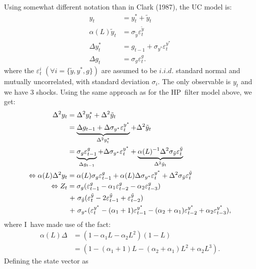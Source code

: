 \documentclass[a4paper,12pt]{article}
\newcommand{\bsq}{\begin{subequations}}\newcommand{\esq}{\end{subequations}}
\begin{document}
\bigskip 

Using somewhat different notation than in Clark (1987), the UC model is:\bsq%
\label{UC}%
\begin{align}
y_{t}& =y_{t}^{\ast }+\tilde{y}_{t}  \label{yUC} \\
\alpha (L)\tilde{y}_{t}& =\sigma _{\tilde{y}}\varepsilon _{t}^{\tilde{y}}
\label{ytldUC} \\
\Delta y_{t}^{\ast }& =g_{t-1}+\sigma _{y^{\ast }}\varepsilon _{t}^{y^{\ast
}}  \label{dy*UC} \\
\Delta g_{t}& =\sigma _{g}\varepsilon _{t}^{g}.  \label{dgUC}
\end{align}%
\esq where the $\varepsilon _{t}^{i}$ $(\forall i=\{\tilde{y},y^{\ast },g\})$
are assumed to be $i.i.d.$ standard normal and mutually uncorrelated, with
standard deviation $\sigma _{i}$. The only observable is $y_{t}$ and we have
3 shocks. Using the same approach as for the HP\ filter model above, we get:%
\begin{align}
\Delta ^{2}y_{t}& =\Delta ^{2}y_{t}^{\ast }+\Delta ^{2}\tilde{y}_{t}  \notag
\\
& =\underbrace{\Delta g_{t-1}+\Delta \sigma _{y^{\ast }}\varepsilon
_{t}^{y^{\ast }}}_{\Delta ^{2}y_{t}^{\ast }}+\Delta ^{2}\tilde{y}_{t}
\label{d2y} \\
& =\underbrace{\sigma _{g}\varepsilon _{t-1}^{g}}_{\Delta g_{t-1}}+\Delta
\sigma _{y^{\ast }}\varepsilon _{t}^{y^{\ast }}+\underbrace{\alpha
(L)^{-1}\Delta ^{2}\sigma _{\tilde{y}}\varepsilon _{t}^{\tilde{y}}}_{\Delta
^{2}\tilde{y}_{t}}  \notag \\
\Leftrightarrow \alpha (L)\Delta ^{2}y_{t}& =\alpha (L)\sigma
_{g}\varepsilon _{t-1}^{g}+\alpha (L)\Delta \sigma _{y^{\ast }}\varepsilon
_{t}^{y^{\ast }}+\Delta ^{2}\sigma _{\tilde{y}}\varepsilon _{t}^{\tilde{y}} 
\notag \\
\Leftrightarrow Z_{t}& =\sigma _{g}(\varepsilon _{t-1}^{g}-\alpha
_{1}\varepsilon _{t-2}^{g}-\alpha _{2}\varepsilon _{t-3}^{g})  \notag \\
& \hspace{1pt}+\hspace{1pt}\sigma _{\tilde{y}}(\varepsilon _{t}^{\tilde{y}%
}-2\varepsilon _{t-1}^{\tilde{y}}+\varepsilon _{t-2}^{\tilde{y}})  \notag \\
& \hspace{1pt}+\hspace{1pt}\sigma _{y^{\ast }}(\varepsilon _{t}^{y^{\ast
}}-(\alpha _{1}+1)\varepsilon _{t-1}^{y^{\ast }}-(\alpha _{2}+\alpha
_{1})\varepsilon _{t-2}^{y^{\ast }}+\alpha _{2}\varepsilon _{t-3}^{y^{\ast
}}),  \notag
\end{align}%
where I\ have made use of the fact: 
\begin{align*}
\alpha (L)\Delta & =(1-\alpha _{1}L-\alpha _{2}L^{2})(1-L) \\
& =(1-(\alpha _{1}+1)L-(\alpha _{2}+\alpha _{1})L^{2}+\alpha _{2}L^{3}).
\end{align*}%
Defining the state vector as
\end{document}
